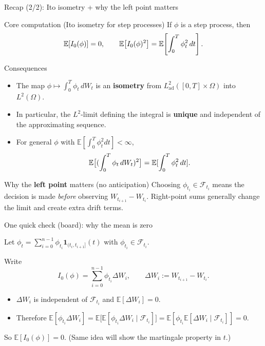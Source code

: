 \documentclass[10pt,aspectratio=169]{beamer}
\newcommand{\E}{\mathbb{E}}
\begin{document}
\begin{frame}{Recap (2/2): Ito isometry + why the left point matters}

\begin{block}{Core computation (Ito isometry for step processes)}
If $\phi$ is a step process, then
\vspace{-4mm}
\[
\E[I_0(\phi)]=0,
\qquad
\E\!\left[I_0(\phi)^2\right]=\E\!\left[\int_0^T \phi_t^2\,dt\right].
\vspace{-4mm}
\]
\vspace{-2mm}
\end{block}\pause
\vspace{-2mm}
\begin{block}{Consequences}
\begin{itemize}
  \item The map $\phi \mapsto \int_0^T \phi_t\,dW_t$ is an \textbf{isometry} from
  $L^2_{\mathrm{ad}}([0,T]\times\Omega)$ into $L^2(\Omega)$. \pause
  \item In particular, the $L^2$-limit defining the integral is \textbf{unique} and
  independent of the approximating sequence. \pause
  \item For general $\phi$ with $\E[\int_0^T \phi_t^2dt]<\infty$,
$$
  \E  \big[ ( \int_0^T \phi_t\,dW_t )^2 \big]
  =\E [\int_0^T \phi_t^2\,dt ].
  \vspace{-2mm}
$$
\end{itemize}
\end{block}\pause

\begin{alertblock}{Why the \textbf{left point} matters (no anticipation)}
Choosing $\phi_{t_i}\in\mathcal{F}_{t_i}$ means the decision is made
\emph{before} observing $W_{t_{i+1}}-W_{t_i}$.
Right-point sums generally change the limit and create extra drift terms.
\end{alertblock}

\end{frame}

\begin{frame}{One quick check (board): why the mean is zero}

Let $\phi_t=\sum_{i=0}^{n-1}\phi_{t_i}\mathbf{1}_{(t_i,t_{i+1}]}(t)$ with $\phi_{t_i}\in\mathcal{F}_{t_i}$.\pause

\medskip
Write
\[
I_0(\phi)=\sum_{i=0}^{n-1}\phi_{t_i}\Delta W_i,
\qquad
\Delta W_i:=W_{t_{i+1}}-W_{t_i}.
\]
\pause

\begin{itemize}
  \item $\Delta W_i$ is independent of $\mathcal{F}_{t_i}$ and $\E[\Delta W_i]=0$.\pause
  \item Therefore $\E[\phi_{t_i}\Delta W_i]=\E\!\big[\E[\phi_{t_i}\Delta W_i\mid\mathcal{F}_{t_i}]\big]
  =\E[\phi_{t_i}\E[\Delta W_i\mid\mathcal{F}_{t_i}]]=0$.\pause
\end{itemize}

\medskip
So \(\E[I_0(\phi)]=0\). (Same idea will show the martingale property in $t$.)

\end{frame}
\end{document}
